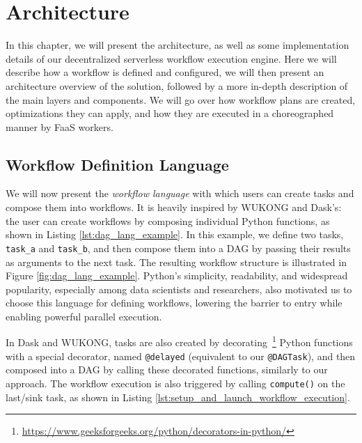 \chapter{Architecture}
\label{chap:arch}
\chaptoc
\bigskip

In this chapter, we will present the architecture, as well as some implementation details of our decentralized serverless workflow execution engine. Here we will describe how a workflow is defined and configured, we will then present an architecture overview of the solution, followed by a more in-depth description of the main layers and components. We will go over how workflow plans are created, optimizations they can apply, and how they are executed in a choreographed manner by FaaS workers.

\section{Workflow Definition Language}
\label{ss:workflow_definition_language}

We will now present the \textit{workflow language} with which users can create tasks and compose them into workflows. It is heavily inspired by WUKONG and Dask's: the user can create workflows by composing individual Python functions, as shown in Listing \ref{lst:dag_lang_example}. In this example, we define two tasks, \texttt{task\_a} and \texttt{task\_b}, and then compose them into a DAG by passing their results as arguments to the next task. The resulting workflow structure is illustrated in Figure \ref{fig:dag_lang_example}. Python's simplicity, readability, and widespread popularity, especially among data scientists and researchers, also motivated us to choose this language for defining workflows, lowering the barrier to entry while enabling powerful parallel execution.

In Dask and WUKONG, tasks are also created by decorating~\footnote{\url{https://www.geeksforgeeks.org/python/decorators-in-python/}} Python functions with a special decorator, named \texttt{@delayed} (equivalent to our \texttt{@DAGTask}), and then composed into a DAG by calling these decorated functions, similarly to our approach. The workflow execution is also triggered by calling \texttt{compute()} on the last/sink task, as shown in Listing \ref{lst:setup_and_launch_workflow_execution}. 

